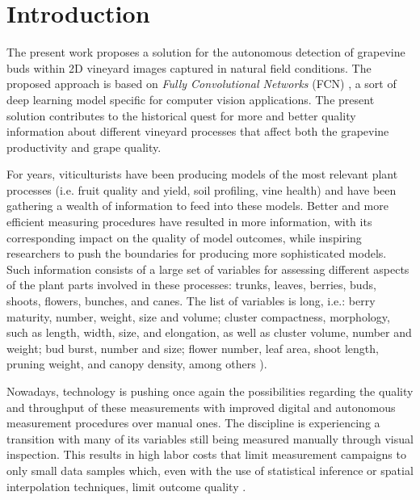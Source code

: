 \documentclass[a4paper,authoryear,review]{elsarticle}
\begin{document}
\linenumbers



\section{Introduction}

The present work proposes a solution for the autonomous detection of grapevine buds within 2D vineyard images captured in natural field conditions. The proposed approach is based on \emph{Fully Convolutional Networks} (FCN) \citep{long2015fully, shelhamer2017fully}, a sort of deep learning model specific for computer vision applications. The present solution contributes to the historical quest for more and better quality information about different vineyard processes that affect both the grapevine productivity and grape quality. 

For years, viticulturists have been producing models of the most relevant plant processes (i.e. fruit quality and yield, soil profiling, vine health) and have been gathering a wealth of information to feed into these models. Better and more efficient measuring procedures have resulted in more information, with its corresponding impact on the quality of model outcomes, while inspiring researchers to push the boundaries for producing more sophisticated models. Such information consists of a large set of variables for assessing different aspects of the plant parts involved in these processes: trunks, leaves, berries, buds, shoots, flowers, bunches, and canes. The list of variables is long, i.e.: berry maturity, number, weight, size and volume; cluster compactness, morphology, such as length, width, size, and elongation, as well as cluster volume, number and weight; bud burst, number and size; flower number, leaf area, shoot length, pruning weight, and canopy density, among others \citep{awriNDmanual1, awriNDmanual3}).

Nowadays, technology is pushing once again the possibilities regarding the quality and throughput of these measurements with improved digital and autonomous measurement procedures over manual ones. The discipline is experiencing a transition with many of its variables still being measured manually through visual inspection. This results in high labor costs that limit measurement campaigns to only small data samples which, even with the use of statistical inference or spatial interpolation techniques, limit outcome quality \citep{whelan1996spatial}. 
\end{document}
